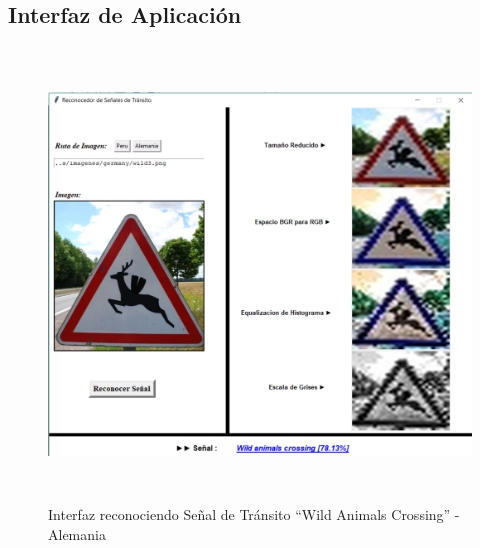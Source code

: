 		\subsection{Interfaz de Aplicación}
			\begin{figure}[H]
				\includegraphics[width=1\textwidth,  height=12cm]{images/interfazWithGermSign} 
				\begin{center}
				\vspace{1em}
				\caption{\small{Interfaz reconociendo Señal de Tránsito “Wild Animals Crossing” - Alemania}}
				{\small{\fontsize{10}{16.8}\selectfont {Fuente: Elaboración propia}}}
				\end{center}
				\vspace{-1.5em}
			\end{figure}

